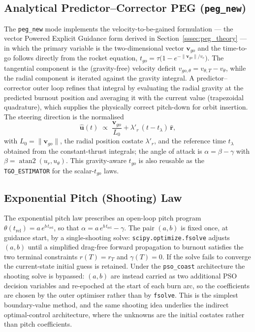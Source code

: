\subsection{Analytical Predictor--Corrector PEG (\texttt{peg\_new})}
\label{ssec:peg_new}

The \texttt{peg\_new} mode implements the velocity-to-be-gained formulation --- the
vector Powered Explicit Guidance form derived in
Section~\ref{sssec:peg_theory} --- in
which the primary variable is the two-dimensional vector $\mathbf{v}_{go}$ and the
time-to-go follows directly from the rocket equation,
$t_{go}=\tau\bigl(1-e^{-\lVert\mathbf{v}_{go}\rVert/v_e}\bigr)$. The tangential
component is the (gravity-free) velocity deficit
$v_{go,\theta}=v_{\theta,T}-v_\theta$, while the radial component is iterated
against the gravity integral. A predictor--corrector outer loop refines that
integral by evaluating the radial gravity at the predicted burnout position and
averaging it with the current value (trapezoidal quadrature), which supplies the
physically correct pitch-down for orbit insertion. The steering direction is the
normalised
\begin{equation}
  \hat{\mathbf u}(t) \;\propto\; \frac{\mathbf{v}_{go}}{L_0}
        + \lambda'_r\,(t-t_\lambda)\,\hat{\mathbf r},
  \label{eq:pegnew_u}
\end{equation}
with $L_0=\lVert\mathbf{v}_{go}\rVert$, the radial position costate $\lambda'_r$,
and the reference time $t_\lambda$ obtained from the constant-thrust integrals;
the angle of attack is $\alpha=\beta-\gamma$ with
$\beta=\operatorname{atan2}(u_r,u_\theta)$. This gravity-aware $t_{go}$ is also
reusable as the \texttt{TGO\_ESTIMATOR} for the scalar-$t_{go}$ laws.

\subsection{Exponential Pitch (Shooting) Law}
\label{ssec:exp_shooting}

The exponential pitch law prescribes an open-loop pitch program
$\theta(t_{\mathrm{rel}}) = a\,e^{b\,t_{\mathrm{rel}}}$, so that
$\alpha = a\,e^{b\,t_{\mathrm{rel}}}-\gamma$. The pair $(a,b)$ is fixed once, at
guidance start, by a single-shooting solve: \texttt{scipy.optimize.fsolve} adjusts
$(a,b)$ until a simplified drag-free forward propagation to burnout satisfies the
two terminal constraints $r(T)=r_T$ and $\gamma(T)=0$. If the solve fails to
converge the current-state initial guess is retained. Under the \texttt{pso\_coast}
architecture the shooting solve is bypassed: $(a,b)$ are instead carried as two
additional PSO decision variables and re-epoched at the start of each burn arc, so
the coefficients are chosen by the outer optimiser rather than by \texttt{fsolve}.
This is the simplest boundary-value method, and the same shooting idea underlies
the indirect optimal-control architecture, where the unknowns are the initial
costates rather than pitch coefficients.

